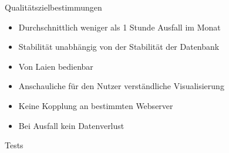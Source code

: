 \begin{frame}{Qualitätszielbestimmungen}
    \begin{itemize}
        \item Durchschnittlich weniger als 1 Stunde Ausfall im Monat
        \item Stabilität unabhängig von der Stabilität der Datenbank
        \item Von Laien bedienbar
        \item Anschauliche für den Nutzer verständliche Visualisierung
        \item Keine Kopplung an bestimmten Webserver
        \item Bei Ausfall kein Datenverlust
    \end{itemize}
\end{frame}

\begin{frame}{Tests}
    
\end{frame}